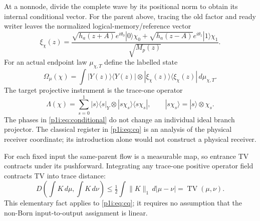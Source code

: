 \documentclass[11pt]{article}
\numberwithin{equation}{section}
\theoremstyle{definition}
\theoremstyle{remark}
\begin{document}
At a nonnode, divide the complete wave by its positional norm to obtain
its internal conditional vector. For the parent above, tracing the old
factor and ready writer leaves the normalized logical-memory/reference
vector
\begin{equation}\label{p1i:eq:conditional}
 \xi_\chi(z)=
 \frac{\sqrt{h_a(z+A)}e^{i\theta_0}|0\rangle\chi_0
       +\sqrt{h_a(z-A)}e^{i\theta_1}|1\rangle\chi_1}
      {\sqrt{M_p(z)}}.
\end{equation}
For an actual endpoint law $\mu_{\chi,T}$ define the labelled state
\begin{equation}\label{p1i:eq:cq}
 \Omega_\mu(\chi)=\int
 |Y(z)\rangle\langle Y(z)|\otimes
 |\xi_\chi(z)\rangle\langle\xi_\chi(z)|\,d\mu_{\chi,T}.
\end{equation}
The target projective instrument is the trace-one operator
\begin{equation}\label{p1i:eq:ideal}
 \Lambda(\chi)=\sum_{s=0}^1|s\rangle\langle s|_Y
               \otimes|s\chi_s\rangle\langle s\chi_s|,
 \qquad |s\chi_s\rangle=|s\rangle\otimes\chi_s.
\end{equation}
The phases in \eqref{p1i:eq:conditional} do not change an individual ideal
branch projector. The classical register in \eqref{p1i:eq:cq} is an
analysis of the physical receiver coordinate; its introduction alone
would not construct a physical receiver.

For each fixed input the same-parent flow is a measurable map, so
entrance TV contracts under its pushforward. Integrating any trace-one
positive operator field contracts TV into trace distance:
\begin{equation}\label{p1i:eq:kernelcontract}
 D\left(\int K\,d\mu,\int K\,d\nu\right)
 \leq\tfrac12\int\|K\|_1\,d|\mu-\nu|
 =\operatorname{TV}(\mu,\nu).
\end{equation}
This elementary fact applies to \eqref{p1i:eq:cq}; it requires no
assumption that the non-Born input-to-output assignment is linear.
\end{document}
